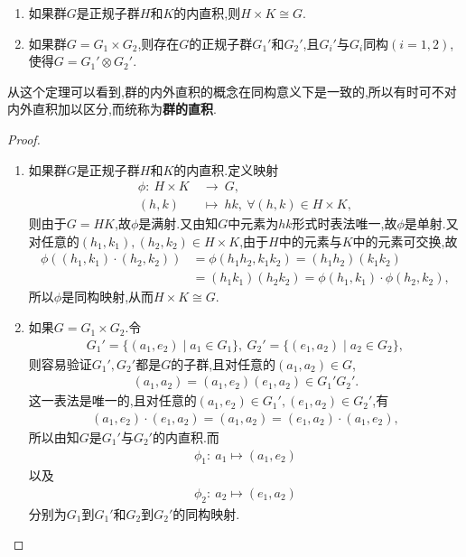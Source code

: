 \documentclass[../../main.tex]{subfiles}%
\begin{document}
\begin{theorem}\label{theorem:两个群的内外直积同构}
\begin{enumerate}[(1)]
\item\label{theorem:两个群的内外直积同构-1} 如果群$G$是正规子群$H$和$K$的内直积,则$H \times K \cong G$.

\item\label{theorem:两个群的内外直积同构-2} 如果群$G = G_1 \times G_2$,则存在$G$的正规子群$G_1'$和$G_2'$,且$G_i'$与$G_i$同构$(i = 1,2)$,使得$G=G_1'\otimes G_2'$.
\end{enumerate}
\end{theorem}
\begin{remark}
从这个定理可以看到,群的内外直积的概念在同构意义下是一致的,所以有时可不对内外直积加以区分,而统称为\textbf{群的直积}.
\end{remark}
\begin{proof}
\begin{enumerate}[(1)]
\item 如果群$G$是正规子群$H$和$K$的内直积.定义映射
\begin{align*}
\phi: \ H \times K \ &\longrightarrow \ G, \\
(h,k) \ &\longmapsto \ hk, \ \forall (h,k) \in H \times K,
\end{align*}
则由于$G = HK$,故$\phi$是满射.又由知$G$中元素为$hk$形式时表法唯一,故$\phi$是单射.又对任意的$(h_1,k_1), (h_2,k_2) \in H \times K$,由于$H$中的元素与$K$中的元素可交换,故
\begin{align*}
\phi((h_1,k_1) \cdot (h_2,k_2)) &= \phi(h_1h_2,k_1k_2) = (h_1h_2)(k_1k_2) \\
&= (h_1k_1)(h_2k_2) = \phi(h_1,k_1) \cdot \phi(h_2,k_2),
\end{align*}
所以$\phi$是同构映射,从而$H \times K \cong G$.

\item 如果$G = G_1 \times G_2$.令
\begin{align*}
G_1' = \{(a_1,e_2) \mid a_1 \in G_1\}, \ G_2' = \{(e_1,a_2) \mid a_2 \in G_2\},
\end{align*}
则容易验证$G_1', G_2'$都是$G$的子群,且对任意的$(a_1,a_2) \in G$,
\begin{align*}
(a_1,a_2) = (a_1,e_2)(e_1,a_2) \in G_1'G_2'.
\end{align*}
这一表法是唯一的,且对任意的$(a_1,e_2) \in G_1', (e_1,a_2) \in G_2'$,有
\begin{align*}
(a_1,e_2) \cdot (e_1,a_2) = (a_1,a_2) = (e_1,a_2) \cdot (a_1,e_2),
\end{align*}
所以由知$G$是$G_1'$与$G_2'$的内直积.而
\begin{align*}
\phi_1: \ a_1 \longmapsto (a_1,e_2)
\end{align*}
以及
\begin{align*}
\phi_2: \ a_2 \longmapsto (e_1,a_2)
\end{align*}
分别为$G_1$到$G_1'$和$G_2$到$G_2'$的同构映射.
\end{enumerate}
\end{proof}
\end{document}
